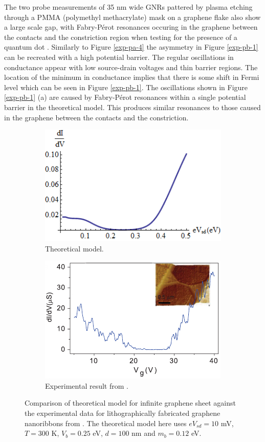 		The two probe measurements of 35 nm wide GNRs pattered by plasma etching through a PMMA (polymethyl methacrylate) mask on a graphene flake also show a large scale gap, with Fabry-P\'{e}rot resonances occuring in the graphene between the contacts and the constriction region when testing for the presence of a quantum dot \cite{b20}. Similarly to Figure \ref{exp-pa-4} the asymmetry in Figure \ref{exp-pb-1} can be recreated with a high potential barrier. The regular oscillations in conductance appear with low source-drain voltages and thin barrier regions. The location of the minimum in conductance implies that there is some shift in Fermi level which can be seen in Figure \ref{exp-pb-1}. The oscillations shown in Figure \ref{exp-pb-1} (a) are caused by Fabry-P\'{e}rot resonances within a single potential barrier in the theoretical model. This produces similar resonances to those caused in the graphene between the contacts and the constriction.

		\begin{figure}[h]
			\begin{subfigure}{0.45\textwidth}
				\centerline{\includegraphics[scale=0.5]{images/exp-c-1}}
				\caption{Theoretical model.}
			\end{subfigure}
			\hspace{1cm}
			\begin{subfigure}{0.45\textwidth}
				\centerline{\includegraphics[scale=0.7]{images/exp-pc-1}}
				\caption{Experimental result from \cite{b21}.}
			\end{subfigure}
			\caption{Comparison of theoretical model for infinite graphene sheet against the experimental data for lithographically fabricated graphene nanoribbons from \cite{b21}. The theoretical model here uses $eV_{sd}=10$ mV, $T=300$ K, $V_{b}=0.25$ eV, $d=100$ nm and $m_{b}=0.12$ eV.}
			\label{exp-pc-1}
		\end{figure}

